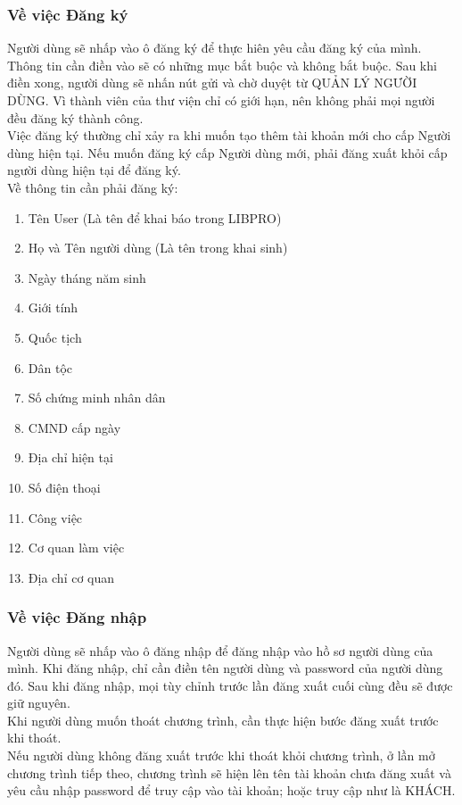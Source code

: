 \documentclass[12pt,a4paper]{report}
\begin{document}
			\subsubsection{Về việc Đăng ký}
			Người dùng sẽ nhấp vào ô đăng ký để thực hiên yêu cầu đăng ký của mình. Thông tin cần điền vào sẽ có những mục bắt buộc và không bắt buộc. Sau khi điền xong, người dùng sẽ nhấn nút gửi và chờ duyệt từ QUẢN LÝ NGƯỜI DÙNG. Vì thành viên của thư viện chỉ có giới hạn, nên không phải mọi người đều đăng ký thành công.\\
			Việc đăng ký thường chỉ xảy ra khi muốn tạo thêm tài khoản mới cho cấp Người dùng hiện tại. Nếu muốn đăng ký cấp Người dùng mới, phải đăng xuất khỏi cấp người dùng hiện tại để đăng ký.\\
			Về thông tin cần phải đăng ký:
			\begin{enumerate}
				\item Tên User (Là tên để khai báo trong LIBPRO)
				\item Họ và Tên người dùng (Là tên trong khai sinh)
				\item Ngày tháng năm sinh
				\item Giới tính
				\item Quốc tịch
				\item Dân tộc
				\item Số chứng minh nhân dân
				\item CMND cấp ngày
				\item Địa chỉ hiện tại
				\item Số điện thoại
				\item Công việc
				\item Cơ quan làm việc
				\item Địa chỉ cơ quan
			\end{enumerate}
			\subsubsection{Về việc Đăng nhập}
			Người dùng sẽ nhấp vào ô đăng nhập để đăng nhập vào hồ sơ người dùng của mình. Khi đăng nhập, chỉ cần điền tên người dùng và password của người dùng đó. Sau khi đăng nhập, mọi tùy chỉnh trước lần đăng xuất cuối cùng đều sẽ được giữ nguyên.\\
			Khi người dùng muốn thoát chương trình, cần thực hiện bước đăng xuất trước khi thoát.\\
			Nếu người dùng không đăng xuất trước khi thoát khỏi chương trình, ở lần mở chương trình tiếp theo, chương trình sẽ hiện lên tên tài khoản chưa đăng xuất và yêu cầu nhập password để truy cập vào tài khoản; hoặc truy cập như là KHÁCH.\\
\end{document}
